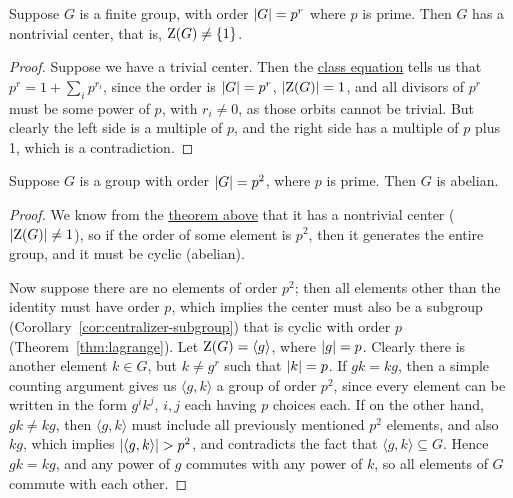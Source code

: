 \begin{theorem}\label{thm:pr-nontrivial-center}
    Suppose \(G\) is a finite group,
    with order \(\abs{G} = p^r\) where \(p\) is prime.
    Then \(G\) has a nontrivial center,
    that is, \(\operatorname{Z}(G) \neq \{1\}\).
\end{theorem}
\begin{proof}
    Suppose we have a trivial center.
    Then the \hyperref[thm:class-equation]{class equation} tells us that
    \(p^r = 1 + \sum_i p^{r_i}\),
    since the order is \(\abs{G} = p^r\), \(\abs{\operatorname{Z}(G)} = 1\),
    and all divisors of \(p^r\) must be some power of \(p\),
    with \(r_i \neq 0\), as those orbits cannot be trivial.
    But clearly the left side is a multiple of \(p\),
    and the right side has a multiple of \(p\) plus 1,
    which is a contradiction.
\end{proof}
\begin{corollary}\label{cor:p2-abelian}
    Suppose \(G\) is a group with order \(\abs{G} = p^2\),
    where \(p\) is prime.
    Then \(G\) is abelian.
\end{corollary}
\begin{proof}
    We know from the \hyperref[thm:class-equation]{theorem above}
    that it has a nontrivial center (\(\abs{\operatorname{Z}(G)} \neq 1\)),
    so if the order of some element is \(p^2\),
    then it generates the entire group, and it must be cyclic (abelian).

    Now suppose there are no elements of order \(p^2\);
    then all elements other than the identity must have order \(p\),
    which implies the center must also be a subgroup
    (Corollary~\ref{cor:centralizer-subgroup})
    that is cyclic with order \(p\) (Theorem~\ref{thm:lagrange}).
    Let \(\operatorname{Z}(G) = \langle g \rangle\), where \(\abs{g} = p\).
    Clearly there is another element \(k \in G\), but \(k \neq g^r\)
    such that \(\abs{k} = p\).
    If \(gk = kg\), then a simple counting argument gives us
    \(\langle g,k \rangle\) a group of order \(p^2\),
    since every element can be written in the form \(g^i k^j\),
    \(i,j\) each having \(p\) choices each.
    If on the other hand, \(gk \neq kg\),
    then \(\langle g,k \rangle\) must include
    all previously mentioned \(p^2\) elements, and also \(kg\),
    which implies \(\abs{\langle g,k \rangle} > p^2\),
    and contradicts the fact that \(\langle g,k \rangle \subseteq G\).
    Hence \(gk = kg\),
    and any power of \(g\) commutes with any power of \(k\),
    so all elements of \(G\) commute with each other.
\end{proof}

